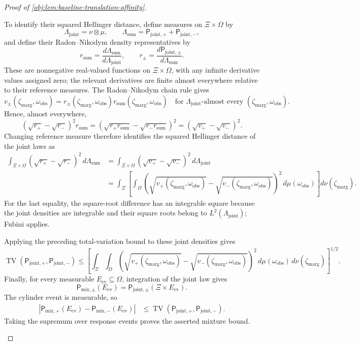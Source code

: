 \documentclass[11pt]{article}
\begin{document}
\begin{proof}[Proof of \cref{obj:lem:baseline-translation-affinity}]
\begin{enumerate}
To identify their squared Hellinger distance, define measures on \(\Xi\times\Omega\) by
\[
\Lambda_{\mathrm{joint}}=\nu\otimes\mu,
\qquad
\Lambda_{\mathrm{sum}}
=\mathsf P_{\mathrm{joint},+}+\mathsf P_{\mathrm{joint},-},
\]
and define their Radon--Nikodym density representatives by
\[
r_{\mathrm{sum}}
=\frac{d\Lambda_{\mathrm{sum}}}{d\Lambda_{\mathrm{joint}}},
\qquad
r_\pm
=\frac{d\mathsf P_{\mathrm{joint},\pm}}{d\Lambda_{\mathrm{sum}}}.
\]
These are nonnegative real-valued functions on \(\Xi\times\Omega\), with any infinite derivative values assigned zero; the relevant derivatives are finite almost everywhere relative to their reference measures. The Radon--Nikodym chain rule gives
\[
v_\pm(\zeta_{\mathrm{marg}},\omega_{\mathrm{obs}})=r_\pm(\zeta_{\mathrm{marg}},\omega_{\mathrm{obs}})r_{\mathrm{sum}}(\zeta_{\mathrm{marg}},\omega_{\mathrm{obs}})
\quad\text{for }\Lambda_{\mathrm{joint}}\text{-almost every }(\zeta_{\mathrm{marg}},\omega_{\mathrm{obs}}).
\]
Hence, almost everywhere,
\[
(\sqrt{r_+}-\sqrt{r_-})^2r_{\mathrm{sum}}
=
\left(\sqrt{r_+r_{\mathrm{sum}}}
      -\sqrt{r_-r_{\mathrm{sum}}}\right)^2
=(\sqrt{v_+}-\sqrt{v_-})^2.
\]
Changing reference measure therefore identifies the squared Hellinger distance of the joint laws as
\[
\begin{aligned}
\int_{\Xi\times\Omega}
(\sqrt{r_+}-\sqrt{r_-})^2\,d\Lambda_{\mathrm{sum}}
&=\int_{\Xi\times\Omega}
(\sqrt{v_+}-\sqrt{v_-})^2\,d\Lambda_{\mathrm{joint}}\\
&=\int_\Xi
\left[\int_\Omega
(\sqrt{v_+(\zeta_{\mathrm{marg}},\omega_{\mathrm{obs}})}-\sqrt{v_-(\zeta_{\mathrm{marg}},\omega_{\mathrm{obs}})})^2\,d\mu(\omega_{\mathrm{obs}})\right]d\nu(\zeta_{\mathrm{marg}}).
\end{aligned}
\]
For the last equality, the square-root difference has an integrable square because the joint densities are integrable and their square roots belong to \(L^2(\Lambda_{\mathrm{joint}})\); Fubini applies.

Applying the preceding total-variation bound to these joint densities gives
\[
\operatorname{TV}(\mathsf P_{\mathrm{joint},+},\mathsf P_{\mathrm{joint},-})
\le
\left[
\int_\Xi\int_\Omega
(\sqrt{v_+(\zeta_{\mathrm{marg}},\omega_{\mathrm{obs}})}-\sqrt{v_-(\zeta_{\mathrm{marg}},\omega_{\mathrm{obs}})})^2\,d\mu(\omega_{\mathrm{obs}})\,d\nu(\zeta_{\mathrm{marg}})
\right]^{1/2}.
\]
Finally, for every measurable \(E_{\mathrm{ev}}\subseteq\Omega\), integration of the joint law gives
\[
\mathsf P_{\mathrm{mix},\pm}(E_{\mathrm{ev}})
=\mathsf P_{\mathrm{joint},\pm}(\Xi\times E_{\mathrm{ev}}).
\]
The cylinder event is measurable, so
\[
\begin{aligned}
\left|\mathsf P_{\mathrm{mix},+}(E_{\mathrm{ev}})
      -\mathsf P_{\mathrm{mix},-}(E_{\mathrm{ev}})\right|
&\le
\operatorname{TV}(\mathsf P_{\mathrm{joint},+},\mathsf P_{\mathrm{joint},-}).
\end{aligned}
\]
Taking the supremum over response events proves the asserted mixture bound.


\end{enumerate}
\end{proof}
\end{document}
